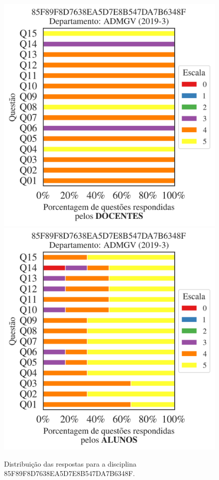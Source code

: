 \documentclass[a4paper,10pt]{article}
\begin{document}
\begin{figure}[h]
\centering
\includegraphics[width=0.485\linewidth]{analise_disciplina_departamento_ADMGV_85F89F8D7638EA5D7E8B547DA7B6348F_docentes.png}
\includegraphics[width=0.485\linewidth]{analise_disciplina_departamento_ADMGV_85F89F8D7638EA5D7E8B547DA7B6348F_alunos.png}
\caption{\label{fig:analise_geral_departamento}                Distribuição das respostas para a disciplina 85F89F8D7638EA5D7E8B547DA7B6348F. }
\end{figure}
\end{document}
